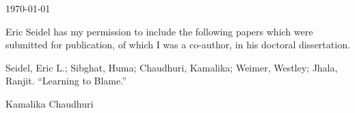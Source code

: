 \documentclass{article}
\begin{document}
\today

Eric Seidel has my permission to include the following papers which were
submitted for publication, of which I was a co-author, in his doctoral
dissertation.

Seidel, Eric L.; Sibghat, Huma; Chaudhuri, Kamalika; Weimer, Westley; Jhala, Ranjit. ``Learning to Blame.''

\baselineskip
Kamalika Chaudhuri
\end{document}
